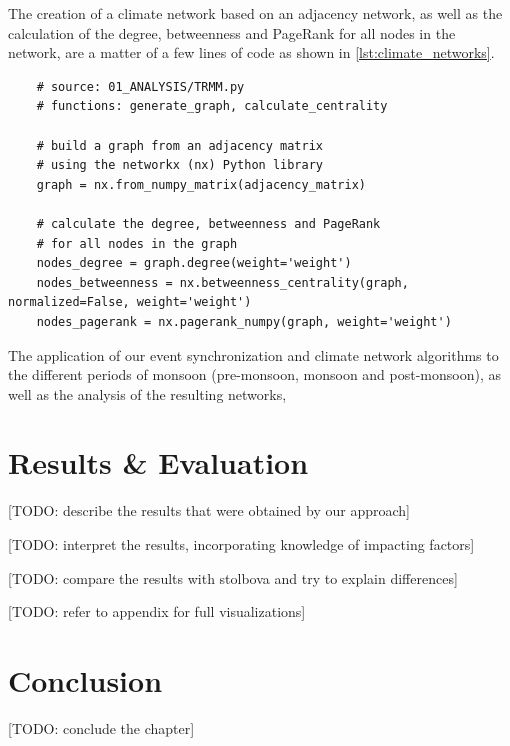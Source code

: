 The creation of a climate network based on an adjacency network, as well as the calculation of the degree, betweenness and PageRank for all nodes in the network, are a matter of a few lines of code as shown in \cref{lst:climate_networks}.

\begin{listing}[H]
  \begin{verbatim}
    # source: 01_ANALYSIS/TRMM.py
    # functions: generate_graph, calculate_centrality

    # build a graph from an adjacency matrix
    # using the networkx (nx) Python library
    graph = nx.from_numpy_matrix(adjacency_matrix)

    # calculate the degree, betweenness and PageRank
    # for all nodes in the graph
    nodes_degree = graph.degree(weight='weight')
    nodes_betweenness = nx.betweenness_centrality(graph, normalized=False, weight='weight')
    nodes_pagerank = nx.pagerank_numpy(graph, weight='weight')

  \end{verbatim}
  \caption{Simplified pseudocode for the creation of a climate network from an adjacency matrix and the calculation of network measures.}
  \label{lst:climate_networks}
\end{listing}

The application of our event synchronization and climate network algorithms to the different periods of monsoon (pre-monsoon, monsoon and post-monsoon), as well as the analysis of the resulting networks,



\section{Results \& Evaluation}
\label{st:event_sync_results}
[TODO: describe the results that were obtained by our approach]

[TODO: interpret the results, incorporating knowledge of impacting factors]

[TODO: compare the results with stolbova and try to explain differences]

[TODO: refer to appendix for full visualizations]

\section{Conclusion}
\label{st:event_sync_conclusion}
[TODO: conclude the chapter]
